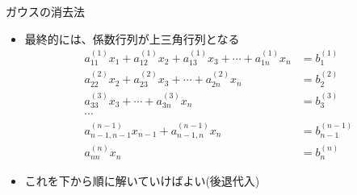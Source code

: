 \begin{frame}[t,fragile]{ガウスの消去法}
  \begin{itemize}
  \item 最終的には、係数行列が上三角行列となる
    \begin{align*}
    a_{11}^{(1)} x_1 + a_{12}^{(1)} x_2 + a_{13}^{(1)} x_3 + \cdots + a_{1n}^{(1)} x_n &= b_{1}^{(1)} \\
    a_{22}^{(2)} x_2 + a_{23}^{(2)} x_3 + \cdots + a_{2n}^{(2)} x_n &= b_{2}^{(2)} \\
    a_{33}^{(3)} x_3 + \cdots + a_{3n}^{(3)} x_n &= b_{3}^{(3)} \\
    \cdots \\
    a_{n-1,n-1}^{(n-1)} x_{n-1} + a_{n-1,n}^{(n-1)} x_n &= b_{n-1}^{(n-1)} \\
    a_{nn}^{(n)} x_n &= b_{n}^{(n)}
    \end{align*}
  \item これを下から順に解いていけばよい(後退代入)
  \end{itemize}
\end{frame}
